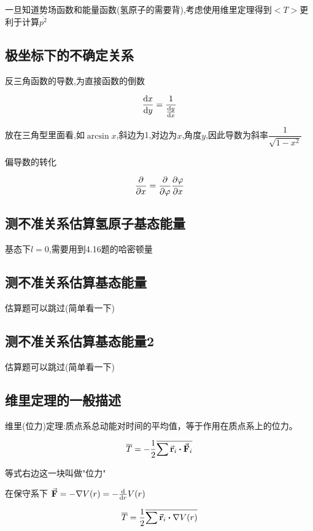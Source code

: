 \documentclass{article}
\begin{document}
            一旦知道势场函数和能量函数(氢原子的需要背),考虑使用维里定理得到$<T>$更利于计算$\overline{p^{2}}$

        \subsection{极坐标下的不确定关系}
            \begin{formal}
                反三角函数的导数,为直接函数的倒数

                $$ \dv{x}{y} = \dfrac{1}{\dv{y}{x}} $$

                放在三角型里面看,如$\arcsin{x}$,斜边为1,对边为$x$,角度$y$,因此导数为斜率$\dfrac{1}{\sqrt{1-x^{2}}}$
            \end{formal}

            偏导数的转化

            $$ \pdv{x} = \pdv{\varphi} \pdv{\varphi}{x} $$

        \subsection{测不准关系估算氢原子基态能量}
            基态下$l=0$,需要用到4.16题的哈密顿量

        \subsection{测不准关系估算基态能量}
            估算题可以跳过(简单看一下)
            
        \subsection{测不准关系估算基态能量2}
            估算题可以跳过(简单看一下)

        \subsection{维里定理的一般描述}
            \begin{formal}
                维里(位力)定理:质点系总动能对时间的平均值，等于作用在质点系上的位力。

                $$ \overline{T} = -\frac{1}{2} \overline{\sum{\va{r}_{i} \vdot \va{F}_{i} }} $$

                等式右边这一块叫做"位力"

                在保守系下  $ \va{F} = - \nabla V(r) = - \dv{r} V(r) $
                
                $$ \overline{T} = \frac{1}{2} \overline{\sum{\va{r}_{i} \vdot \nabla V(r) }} $$
                
            \end{formal}
            
\end{document}
